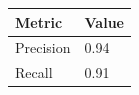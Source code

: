 \begin{tabular}{ll}
    \toprule
    Metric & Value \\
    \midrule
    Precision & 0.94 \\
    Recall    & 0.91 \\
    \bottomrule
\end{tabular}